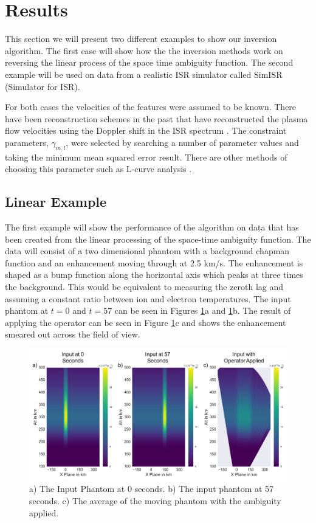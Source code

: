 \section{Results}
\label{sec:results}
This section we will present two different examples to show our inversion algorithm. The first case will show how the the inversion methods work on reversing the linear process of the space time ambiguity function. The second example will be used on data from a realistic ISR simulator called SimISR (Simulator for ISR).

For both cases the velocities of the features were assumed to be known. There have been reconstruction schemes in the past that have reconstructed the plasma flow velocities using the Doppler shift in the ISR spectrum \citep{butler:imagingfregiondrifts}. The constraint parameters, $\gamma_{m,l}$, were selected by searching a number of parameter values and taking the minimum mean squared error result. There are other methods of choosing this parameter such as L-curve analysis \citep{Karl:2005jy}. 

\subsection{Linear Example}

The first example will show the performance of the algorithm on data that has been created from the linear processing of the space-time ambiguity function. The data will consist of a two dimensional phantom with a background chapman function and an enhancement moving through at 2.5 km/s. The enhancement is shaped as a bump function along the horizontal axis which peaks at three times the background. This would be equivalent to measuring the zeroth lag and assuming a constant ratio between ion and electron temperatures. The input phantom at $t=0$ and $t=57$ can be seen in Figures \ref{fig:simpinputfast}a and \ref{fig:simpinputfast}b. The result of applying the operator can be seen in Figure \ref{fig:simpinputfast}c and shows the enhancement smeared out across the field of view.

\begin{figure}[!ht]
\centering
\includegraphics[width=6in]{Simpleinputfast}
\caption{a) The Input Phantom at 0 seconds. b) The input phantom at 57 seconds. c) The average of the moving phantom with the ambiguity applied.}
\label{fig:simpinputfast}
\end{figure}

